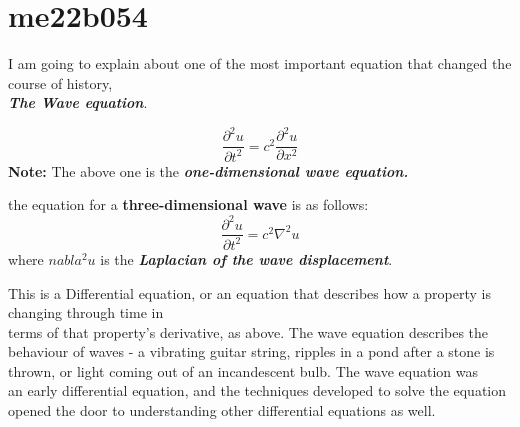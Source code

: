 \documentclass{article}
\begin{document}
\section{me22b054}
I am going to explain about one of the most important equation that changed the course of history, \\ \textbf{\textit{The Wave equation}}.

\begin{equation}
\frac{\partial^2 u}{\partial t^2} = c^2 \frac{\partial^2 u}{\partial x^2}
\end{equation}
 \textbf{Note:} The above one is the \textbf{\textit{one-dimensional wave equation.}}
 
 the equation for a \textbf{three-dimensional wave } is as follows:
 \begin{equation}
 \frac{\partial^2 u}{\partial t^2} = c^2 \nabla^2 u
 \end{equation}
  where \textbf{$nabla^2 u$} is the \textbf{\textit{Laplacian of the wave displacement}}.
  
  
 This is a Differential equation, or an equation that describes how a property is changing through time in \\ terms of that property's  derivative, as above. The wave equation describes the \\ behaviour  of waves - a vibrating guitar string, ripples in a pond after a stone is \\ thrown,  or light coming out of an incandescent bulb. The wave equation was \\ an  early differential equation, and the techniques developed to solve the equation \\ opened the door to understanding other differential equations as well.
 
\end{document}
